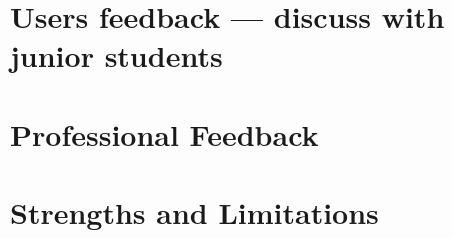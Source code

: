 \documentclass[master.tex]{subfiles}
\begin{document}
\section{Users feedback --- discuss with junior students}

\section{Professional Feedback}

\section{Strengths and Limitations}



\end{document}
